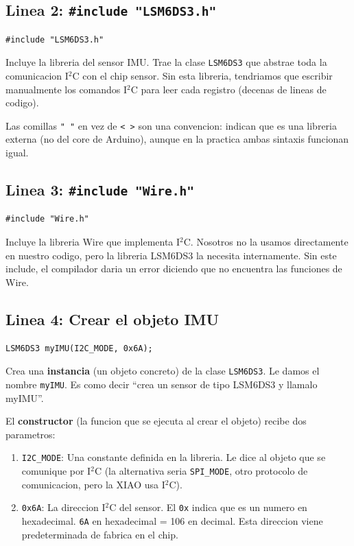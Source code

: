 \documentclass[11pt,a4paper]{article}
\begin{document}
\subsection{Linea 2: \texttt{\#include "LSM6DS3.h"}}

\begin{lstlisting}[style=arduino]
#include "LSM6DS3.h"
\end{lstlisting}

Incluye la libreria del sensor IMU. Trae la clase \texttt{LSM6DS3}
que abstrae toda la comunicacion I$^2$C con el chip sensor. Sin
esta libreria, tendriamos que escribir manualmente los comandos
I$^2$C para leer cada registro (decenas de lineas de codigo).

Las comillas \texttt{" "} en vez de \texttt{< >} son una convencion:
indican que es una libreria externa (no del core de Arduino),
aunque en la practica ambas sintaxis funcionan igual.

\subsection{Linea 3: \texttt{\#include "Wire.h"}}

\begin{lstlisting}[style=arduino]
#include "Wire.h"
\end{lstlisting}

Incluye la libreria Wire que implementa I$^2$C. Nosotros no la
usamos directamente en nuestro codigo, pero la libreria LSM6DS3
la necesita internamente. Sin este include, el compilador daria
un error diciendo que no encuentra las funciones de Wire.

\subsection{Linea 4: Crear el objeto IMU}

\begin{lstlisting}[style=arduino]
LSM6DS3 myIMU(I2C_MODE, 0x6A);
\end{lstlisting}

Crea una \textbf{instancia} (un objeto concreto) de la clase
\texttt{LSM6DS3}. Le damos el nombre \texttt{myIMU}. Es como decir
``crea un sensor de tipo LSM6DS3 y llamalo myIMU''.

El \textbf{constructor} (la funcion que se ejecuta al crear el
objeto) recibe dos parametros:

\begin{enumerate}
    \item \texttt{I2C\_MODE}: Una constante definida en la libreria.
          Le dice al objeto que se comunique por I$^2$C (la
          alternativa seria \texttt{SPI\_MODE}, otro protocolo de
          comunicacion, pero la XIAO usa I$^2$C).

    \item \texttt{0x6A}: La direccion I$^2$C del sensor. El
          \texttt{0x} indica que es un numero en hexadecimal.
          \texttt{6A} en hexadecimal = 106 en decimal. Esta direccion
          viene predeterminada de fabrica en el chip.
\end{enumerate}
\end{document}
